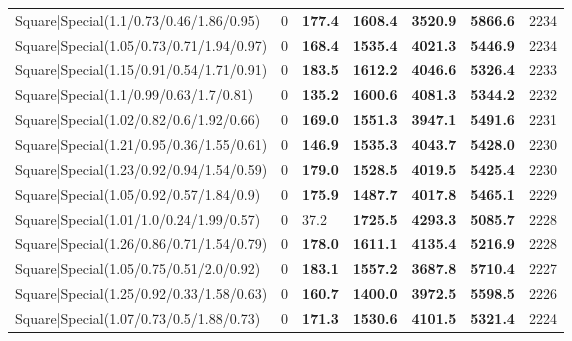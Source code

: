 \begin{tabular}{lrllllr}
 Square|Special(1.1/0.73/0.46/1.86/0.95)                       &             0   & \textbf{177.4} & \textbf{1608.4} & \textbf{3520.9} & \textbf{5866.6} &         2234 \\
 Square|Special(1.05/0.73/0.71/1.94/0.97)                      &             0   & \textbf{168.4} & \textbf{1535.4} & \textbf{4021.3} & \textbf{5446.9} &         2234 \\
 Square|Special(1.15/0.91/0.54/1.71/0.91)                      &             0   & \textbf{183.5} & \textbf{1612.2} & \textbf{4046.6} & \textbf{5326.4} &         2233 \\
 Square|Special(1.1/0.99/0.63/1.7/0.81)                        &             0   & \textbf{135.2} & \textbf{1600.6} & \textbf{4081.3} & \textbf{5344.2} &         2232 \\
 Square|Special(1.02/0.82/0.6/1.92/0.66)                       &             0   & \textbf{169.0} & \textbf{1551.3} & \textbf{3947.1} & \textbf{5491.6} &         2231 \\
 Square|Special(1.21/0.95/0.36/1.55/0.61)                      &             0   & \textbf{146.9} & \textbf{1535.3} & \textbf{4043.7} & \textbf{5428.0} &         2230 \\
 Square|Special(1.23/0.92/0.94/1.54/0.59)                      &             0   & \textbf{179.0} & \textbf{1528.5} & \textbf{4019.5} & \textbf{5425.4} &         2230 \\
 Square|Special(1.05/0.92/0.57/1.84/0.9)                       &             0   & \textbf{175.9} & \textbf{1487.7} & \textbf{4017.8} & \textbf{5465.1} &         2229 \\
 Square|Special(1.01/1.0/0.24/1.99/0.57)                       &             0   & 37.2           & \textbf{1725.5} & \textbf{4293.3} & \textbf{5085.7} &         2228 \\
 Square|Special(1.26/0.86/0.71/1.54/0.79)                      &             0   & \textbf{178.0} & \textbf{1611.1} & \textbf{4135.4} & \textbf{5216.9} &         2228 \\
 Square|Special(1.05/0.75/0.51/2.0/0.92)                       &             0   & \textbf{183.1} & \textbf{1557.2} & \textbf{3687.8} & \textbf{5710.4} &         2227 \\
 Square|Special(1.25/0.92/0.33/1.58/0.63)                      &             0   & \textbf{160.7} & \textbf{1400.0} & \textbf{3972.5} & \textbf{5598.5} &         2226 \\
 Square|Special(1.07/0.73/0.5/1.88/0.73)                       &             0   & \textbf{171.3} & \textbf{1530.6} & \textbf{4101.5} & \textbf{5321.4} &         2224 \\

\end{tabular}
